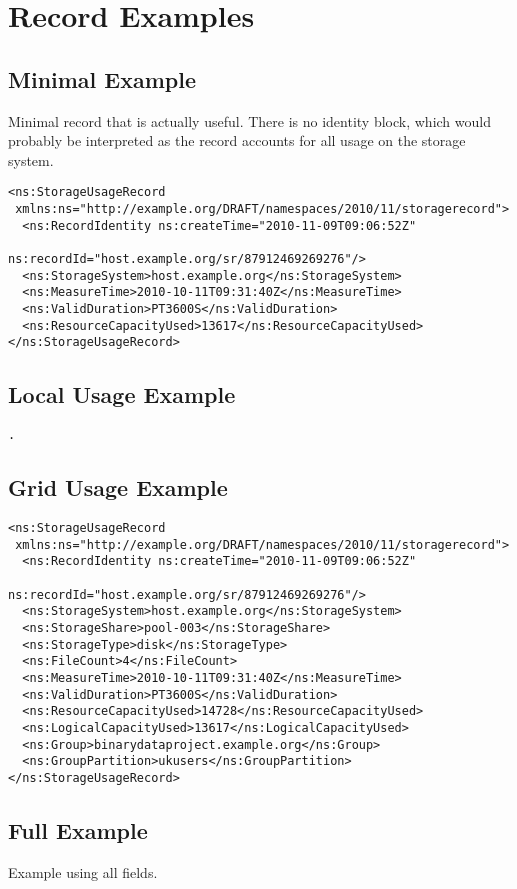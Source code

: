 
\section{Record Examples}
\label{sec:record-examples}


\subsection{Minimal Example}

Minimal record that is actually useful. There is no identity block, which would
probably be interpreted as the record accounts for all usage on the storage
system.

\begin{verbatim}
<ns:StorageUsageRecord
 xmlns:ns="http://example.org/DRAFT/namespaces/2010/11/storagerecord">
  <ns:RecordIdentity ns:createTime="2010-11-09T09:06:52Z"
                     ns:recordId="host.example.org/sr/87912469269276"/>
  <ns:StorageSystem>host.example.org</ns:StorageSystem>
  <ns:MeasureTime>2010-10-11T09:31:40Z</ns:MeasureTime>
  <ns:ValidDuration>PT3600S</ns:ValidDuration>
  <ns:ResourceCapacityUsed>13617</ns:ResourceCapacityUsed>
</ns:StorageUsageRecord>
\end{verbatim}


\subsection{Local Usage Example}


\begin{verbatim}
.
\end{verbatim}



\subsection{Grid Usage Example}

\begin{verbatim}
<ns:StorageUsageRecord
 xmlns:ns="http://example.org/DRAFT/namespaces/2010/11/storagerecord">
  <ns:RecordIdentity ns:createTime="2010-11-09T09:06:52Z"
                     ns:recordId="host.example.org/sr/87912469269276"/>
  <ns:StorageSystem>host.example.org</ns:StorageSystem>
  <ns:StorageShare>pool-003</ns:StorageShare>
  <ns:StorageType>disk</ns:StorageType>
  <ns:FileCount>4</ns:FileCount>
  <ns:MeasureTime>2010-10-11T09:31:40Z</ns:MeasureTime>
  <ns:ValidDuration>PT3600S</ns:ValidDuration>
  <ns:ResourceCapacityUsed>14728</ns:ResourceCapacityUsed>
  <ns:LogicalCapacityUsed>13617</ns:LogicalCapacityUsed>
  <ns:Group>binarydataproject.example.org</ns:Group>
  <ns:GroupPartition>ukusers</ns:GroupPartition>
</ns:StorageUsageRecord>
\end{verbatim}

\subsection{Full Example}

Example using all fields.

